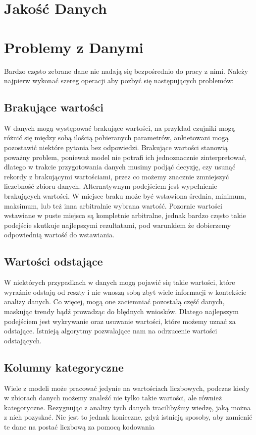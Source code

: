 \documentclass{book}
\begin{document}
\section{Jakość Danych}
\section{Problemy z Danymi}

Bardzo często zebrane dane nie nadają się bezpośrednio do pracy z nimi. 
Należy najpierw wykonać szereg operacji aby pozbyć się następujących 
problemów:   
\subsection{Brakujące wartości}
W danych mogą występować brakujące wartości, na przykład czujniki 
mogą różnić się między sobą ilością pobieranych parametrów, 
ankietowani mogą pozostawić niektóre pytania bez odpowiedzi. 
Brakujące wartości stanowią poważny problem, ponieważ model nie 
potrafi ich jednoznacznie zinterpretować, dlatego w trakcie 
przygotowania danych musimy podjąć decyzję, czy usunąć rekordy z 
brakującymi wartościami, przez co możemy znacznie zmniejszyć 
liczebność zbioru danych. Alternatywnym podejściem jest wypełnienie 
brakujących wartości. W miejsce braku może być wstawiona średnia, 
minimum, maksimum, lub też inna arbitralnie wybrana wartość. 
Pozornie wartości wstawiane w puste miejsca są kompletnie arbitralne, 
jednak bardzo często takie podejście skutkuje najlepszymi rezultatami, 
pod warunkiem że dobierzemy odpowiednią wartość do wstawiania. 
\subsection{Wartości odstające}
W niektórych przypadkach w danych mogą pojawić się takie wartości, 
które wyraźnie odstają od reszty i nie wnoszą sobą zbyt wiele 
informacji w kontekście analizy danych. Co więcej, mogą one 
zaciemniać pozostałą część danych, maskując trendy bądź prowadząc 
do błędnych wniosków. Dlatego najlepszym podejściem jest wykrywanie 
oraz usuwanie wartości, które możemy uznać za odstające. 
Istnieją algorytmy pozwalające nam na odrzucenie wartości odstających.
\subsection{Kolumny kategoryczne}
Wiele z modeli może pracować jedynie na wartościach liczbowych, 
podczas kiedy w zbiorach danych możemy znaleźć nie tylko takie wartości, 
ale również kategoryczne. Rezygnując z analizy tych danych tracilibyśmy 
wiedzę, jaką można z nich pozyskać. Nie jest to jednak konieczne, 
gdyż istnieją sposoby, aby zamienić te dane na postać liczbową za 
pomocą kodowania
\end{document}
